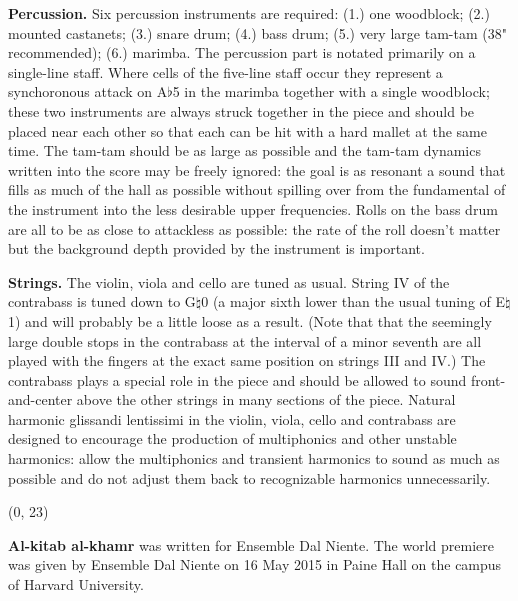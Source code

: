 \documentclass[10pt]{article}
\begin{document}
\begin{textblock}{23}
\textbf{Percussion.} Six percussion instruments are required: (1.) one
woodblock; (2.) mounted castanets; (3.) snare drum; (4.) bass drum; (5.) very
large tam-tam (38" recommended); (6.) marimba. The percussion part is notated
primarily on a single-line staff. Where cells of the five-line staff occur they
represent a synchoronous attack on A$\flat$5 in the marimba together with a
single woodblock; these two instruments are always struck together in the piece
and should be placed near each other so that each can be hit with a hard mallet
at the same time. The tam-tam should be as large as possible and the tam-tam
dynamics written into the score may be freely ignored: the goal is as resonant
a sound that fills as much of the hall as possible without spilling over from
the fundamental of the instrument into the less desirable upper frequencies.
Rolls on the bass drum are all to be as close to attackless as possible: the
rate of the roll doesn't matter but the background depth provided by the
instrument is important.

\textbf{Strings.} The violin, viola and cello are tuned as usual. String IV of
the contrabass is tuned down to G$\natural$0 (a major sixth lower than the
usual tuning of E$\natural$1) and will probably be a little loose as a result.
(Note that that the seemingly large double stops in the contrabass at the
interval of a minor seventh are all played with the fingers at the exact same
position on strings III and IV.) The contrabass plays a special role in the
piece and should be allowed to sound front-and-center above the other strings
in many sections of the piece. Natural harmonic glissandi lentissimi in the
violin, viola, cello and contrabass are designed to encourage the production of
multiphonics and other unstable harmonics: allow the multiphonics and transient
harmonics to sound as much as possible and do not adjust them back to
recognizable harmonics unnecessarily.

\end{textblock}

\begin{textblock}{23}(0, 23)

\textbf{Al-kitab al-khamr} was written for Ensemble Dal Niente. The world
premiere was given by Ensemble Dal Niente on 16 May 2015 in Paine Hall on the
campus of Harvard University.

\end{textblock}
\end{document}
